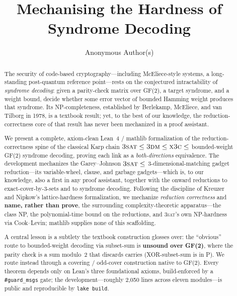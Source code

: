 \documentclass[a4paper,UKenglish,cleveref,autoref]{lipics-v2021}
\title{Mechanising the Hardness of Syndrome Decoding}
\author{Anonymous Author(s)}{Affiliation \and Country}{anon@example.org}{}{}
\begin{document}
\maketitle

\begin{abstract}
The security of code-based cryptography---including McEliece-style systems, a long-standing post-quantum
reference point---rests on the conjectured intractability of \emph{syndrome decoding}: given a parity-check
matrix over GF(2), a target syndrome, and a weight bound, decide whether some error vector of bounded Hamming
weight produces that syndrome. Its NP-completeness, established by Berlekamp, McEliece, and van Tilborg in 1978,
is a textbook result; yet, to the best of our knowledge, the reduction-correctness core of that result has never
been mechanized in a proof assistant.

We present a complete, axiom-clean Lean~4 / mathlib formalization of the reduction-correctness spine of the
classical Karp chain $\textsc{3sat} \le \textsc{3dm} \le \textsc{x3c} \le$ bounded-weight GF(2) syndrome
decoding, proving each link as a \emph{both-directions} equivalence. The development mechanizes the
Garey--Johnson $\textsc{3sat} \le$ 3-dimensional-matching gadget reduction---its variable-wheel, clause, and
garbage gadgets---which is, to our knowledge, also a first in any proof assistant, together with the onward
reductions to exact-cover-by-3-sets and to syndrome decoding. Following the discipline of Kreuzer and Nipkow's
lattice-hardness formalization, we mechanize \emph{reduction correctness} and \textbf{name, rather than prove},
the surrounding complexity-theoretic apparatus---the class NP, the polynomial-time bound on the reductions, and
\textsc{3sat}'s own NP-hardness via Cook--Levin; mathlib supplies none of this scaffolding.

A central lesson is a subtlety the textbook construction glosses over: the ``obvious'' route to bounded-weight
decoding via subset-sum is \textbf{unsound over GF(2)}, where the parity check is a sum modulo~2 that discards
carries (XOR-subset-sum is in P). We route instead through a covering / odd-cover construction native to GF(2).
Every theorem depends only on Lean's three foundational axioms, build-enforced by a \lstinline{#guard_msgs}
gate; the development---roughly 2,050 lines across eleven modules---is public and reproducible by
\lstinline{lake build}.
\end{abstract}

\end{document}
